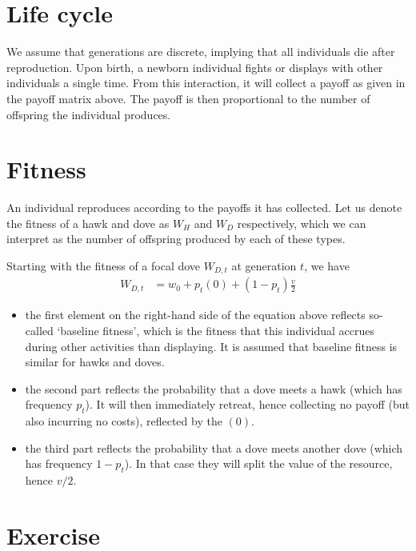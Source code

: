 \documentclass[
]{book}
\providecommand{\tightlist}{%
  \setlength{\itemsep}{0pt}\setlength{\parskip}{0pt}}
\begin{document}
\hypertarget{life-cycle}{%
\section{Life cycle}\label{life-cycle}}

We assume that generations are discrete, implying that all individuals die after reproduction. Upon birth, a newborn individual fights or displays with other individuals a single time. From this interaction, it will collect a payoff as given in the payoff matrix above. The payoff is then proportional to the number of offspring the individual produces.

\hypertarget{fitness}{%
\section{Fitness}\label{fitness}}

An individual reproduces according to the payoffs it has collected. Let us denote the fitness of a hawk and dove as \(W_{H}\) and \(W_{D}\) respectively, which we can interpret as the number of offspring produced by each of these types.

Starting with the fitness of a focal dove \(W_{D,t}\) at generation \(t\), we have
\begin{align}
W_{D,t} &= w_{0} + p_{t} (0) + \left(1-p_{t} \right) \frac{v}{2}
\end{align}

\begin{itemize}
\tightlist
\item
  the first element on the right-hand side of the equation above reflects so-called `baseline fitness', which is the fitness that this individual accrues during other activities than displaying. It is assumed that baseline fitness is similar for hawks and doves.
\item
  the second part reflects the probability that a dove meets a hawk (which has frequency \(p_{t}\)). It will then immediately retreat, hence collecting no payoff (but also incurring no costs), reflected by the \((0)\).
\item
  the third part reflects the probability that a dove meets another dove (which has frequency \(1-p_{t}\)). In that case they will split the value of the resource, hence \(v/2\).
\end{itemize}

\hypertarget{exercise-2}{%
\section{Exercise}\label{exercise-2}}
\end{document}
